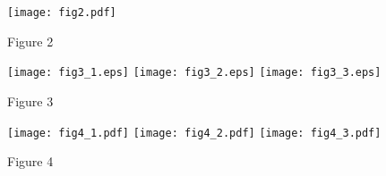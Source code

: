 \documentclass[preprint,12pt,numbers,sort&compress]{elsarticle}
\begin{document}
\begin{figure}[h]
\centering
\texttt{[image: fig2.pdf]}
\begin{center}
Figure 2
\end{center}
\label{device2}
\end{figure}

\begin{figure}[h]
\centering
\texttt{[image: fig3\_1.eps]}
\texttt{[image: fig3\_2.eps]}
\texttt{[image: fig3\_3.eps]}
\begin{center}
Figure 3
\end{center}
\label{example}
\end{figure}

\begin{figure}[h]
\centering
\texttt{[image: fig4\_1.pdf]}
\texttt{[image: fig4\_2.pdf]}
\texttt{[image: fig4\_3.pdf]}
\begin{center}
Figure 4
\end{center}
\label{Robust}
\end{figure}
\end{document}
